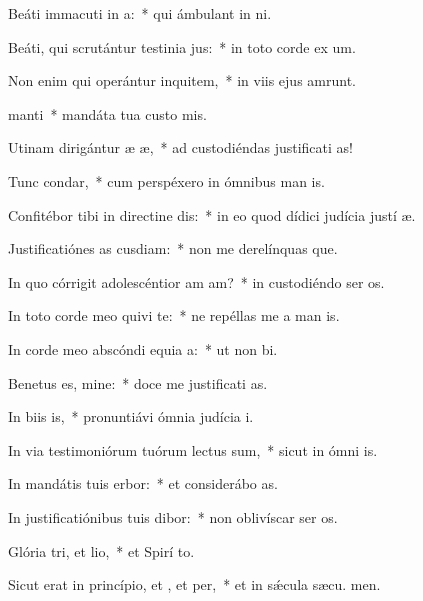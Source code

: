 \item Beáti immacuti in a:~* qui ámbulant in  ni.
\item Beáti, qui scrutántur testinia jus:~* in toto corde ex um.
\item Non enim qui operántur inquitem,~* in viis ejus amrunt.
\item {} manti~* mandáta tua custo mis.
\item Utinam dirigántur æ æ,~* ad custodiéndas justificati as!
\item Tunc  condar,~* cum perspéxero in ómnibus man is.
\item Confitébor tibi in directine dis:~* in eo quod dídici judícia justí æ.
\item Justificatiónes as cusdiam:~* non me derelínquas que.
\item In quo córrigit adolescéntior am am?~* in custodiéndo ser os.
\item In toto corde meo quivi te:~* ne repéllas me a man is.
\item In corde meo abscóndi equia a:~* ut non  bi.
\item Benetus es, mine:~* doce me justificati as.
\item In biis is,~* pronuntiávi ómnia judícia  i.
\item In via testimoniórum tuórum lectus sum,~* sicut in ómni is.
\item In mandátis tuis erbor:~* et considerábo  as.
\item In justificatiónibus tuis dibor:~* non oblivíscar ser os.
\item Glória tri, et lio,~* et Spirí to.
\item Sicut erat in princípio, et , et per,~* et in sǽcula sæcu. men.
